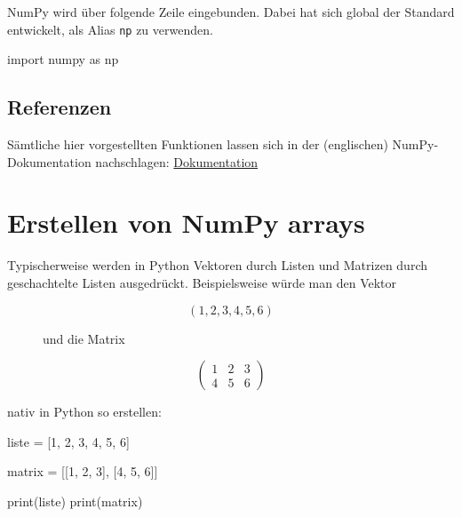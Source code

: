 \documentclass[
  letterpaper,
  DIV=11,
  numbers=noendperiod]{scrreprt}
\newenvironment{Shaded}{\begin{snugshade}}{\end{snugshade}}
\newcommand{\BuiltInTok}[1]{\textcolor[rgb]{0.00,0.23,0.31}{#1}}
\newcommand{\DecValTok}[1]{\textcolor[rgb]{0.68,0.00,0.00}{#1}}
\newcommand{\ImportTok}[1]{\textcolor[rgb]{0.00,0.46,0.62}{#1}}
\newcommand{\NormalTok}[1]{\textcolor[rgb]{0.00,0.23,0.31}{#1}}
\newcommand{\OperatorTok}[1]{\textcolor[rgb]{0.37,0.37,0.37}{#1}}
\begin{document}
NumPy wird über folgende Zeile eingebunden. Dabei hat sich global der
Standard entwickelt, als Alias \texttt{np} zu verwenden.

\begin{Shaded}
\begin{Highlighting}[]
\ImportTok{import}\NormalTok{ numpy }\ImportTok{as}\NormalTok{ np}
\end{Highlighting}
\end{Shaded}

\section{Referenzen}\label{referenzen}

Sämtliche hier vorgestellten Funktionen lassen sich in der (englischen)
NumPy-Dokumentation nachschlagen:
\href{https://numpy.org/doc/}{Dokumentation}

\chapter{Erstellen von NumPy arrays}\label{erstellen-von-numpy-arrays}

Typischerweise werden in Python Vektoren durch Listen und Matrizen durch
geschachtelte Listen ausgedrückt. Beispielsweise würde man den Vektor

\begin{figure}

\begin{minipage}{0.33\linewidth}
\[
(1, 2, 3, 4, 5, 6) 
\]\end{minipage}%
%
\begin{minipage}{0.33\linewidth}
und die Matrix\end{minipage}%
%
\begin{minipage}{0.33\linewidth}
\[
\begin{pmatrix}
1 & 2 & 3\\
4 & 5 & 6
\end{pmatrix}
\]\end{minipage}%

\end{figure}%

nativ in Python so erstellen:

\begin{Shaded}
\begin{Highlighting}[]
\NormalTok{liste }\OperatorTok{=}\NormalTok{ [}\DecValTok{1}\NormalTok{, }\DecValTok{2}\NormalTok{, }\DecValTok{3}\NormalTok{, }\DecValTok{4}\NormalTok{, }\DecValTok{5}\NormalTok{, }\DecValTok{6}\NormalTok{]}

\NormalTok{matrix }\OperatorTok{=}\NormalTok{ [[}\DecValTok{1}\NormalTok{, }\DecValTok{2}\NormalTok{, }\DecValTok{3}\NormalTok{], [}\DecValTok{4}\NormalTok{, }\DecValTok{5}\NormalTok{, }\DecValTok{6}\NormalTok{]]}

\BuiltInTok{print}\NormalTok{(liste)}
\BuiltInTok{print}\NormalTok{(matrix)}
\end{Highlighting}
\end{Shaded}
\end{document}
